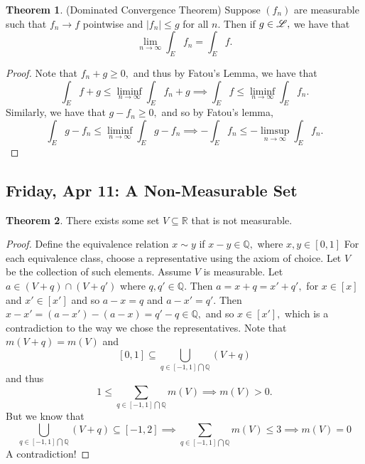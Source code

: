 \documentclass[10pt, oneside]{article}
\newcommand{\bbR}{\mathbb{R}}
\newcommand{\bbQ}{\mathbb{Q}}
\theoremstyle{definition}
\newtheorem{thm}{Theorem}
\begin{document}
 \begin{thm}
     (Dominated Convergence Theorem) Suppose $(f_n)$ are measurable such that $f_n \to f$ pointwise and $|f_n| \leq g$ for all $n.$ Then if $g \in \cal L,$ we have that 
     \[\lim_{n\to \infty }\int_E f_n = \int_E f.\]
 \end{thm}
 \begin{proof}
     Note that $f_n + g \geq 0,$ and thus by Fatou's Lemma, we have that 
     \[\int_E f + g \leq \liminf_{n\to \infty}\int_E f_n + g \implies \int_E f \leq \liminf_{n\to \infty} \int_E f_n.\] Similarly, we have that $g - f_n \geq 0,$ and so by Fatou's lemma, 
     \[\int_E g - f_n \leq \liminf_{n\to \infty} \int_E g - f_n \implies -\int_Ef_n \leq -\limsup_{n\to \infty} \int_E f_n.\]
 \end{proof}

\newpage
\subsection{Friday, Apr 11: A Non-Measurable Set}
\begin{thm}
    There exists some set $V \subseteq \bbR$ that is not measurable.
\end{thm}
\begin{proof}
Define the equivalence relation $x\sim y$ if $x - y \in \bbQ,$ where $x,y \in [0,1]$ For each equivalence class, choose a representative using the axiom of choice. Let $V$ be the collection of such elements. Assume $V$ is measurable. Let $a\in (V + q) \cap (V + q')$ where $q, q' \in \bbQ.$ Then $a = x + q = x' + q',$ for $x \in [x]$ and $x' \in [x']$ and so $a - x = q$ and $a - x' = q'.$ Then $x - x' = (a-x') - (a-x) = q' -q \in \bbQ,$ and so $x \in [x'],$ which is a contradiction to the way we chose the representatives. Note that $m(V + q) = m(V)$ and 
\[[0,1] \subseteq \bigcup_{q\in [-1,1]\bigcap \bbQ} (V + q)\] and thus 
\[1 \leq \sum_{q\in [-1,1]\bigcap \bbQ} m(V) \implies m(V) >0.\] But we know that 
\[\bigcup_{q\in [-1,1]\bigcap \bbQ} (V + q)\subseteq [-1,2] \implies \sum_{q\in [-1,1]\bigcap \bbQ} m(V) \leq 3 \implies m(V) = 0\]
A contradiction!
    
\end{proof}

\newpage
\end{document}
